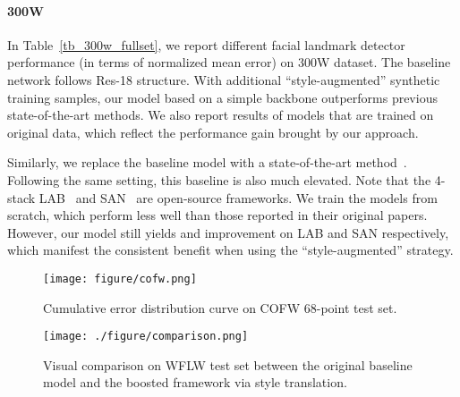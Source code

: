 \documentclass[10pt,twocolumn,letterpaper]{article}
\begin{document}
\vspace{-0.12in}
\paragraph{300W} 
In Table~\ref{tb_300w_fullset}, we report different facial landmark detector performance (in terms of normalized mean error) on 300W dataset. The baseline network follows Res-18 structure. With additional ``style-augmented'' synthetic training samples, our model based on a simple backbone outperforms previous state-of-the-art methods. We also report results of models that are trained on original data, which reflect the performance gain brought by our approach.

Similarly, we replace the baseline model with a state-of-the-art method~\cite{SAN}. Following the same setting, this baseline is also much elevated. Note that the 4-stack LAB~\cite{LAB} and SAN~\cite{SAN} are open-source frameworks. We train the models from scratch, which perform less well than those reported in their original papers. However, our model still yields  and  improvement on LAB and SAN respectively, which manifest the consistent benefit when using the ``style-augmented'' strategy.

\begin{figure}[t]
\begin{center}
  \texttt{[image: figure/cofw.png]}
\end{center}
\vspace{-0.5cm}
   \caption{{Cumulative error distribution curve on COFW 68-point test set.}}
\label{fig:cofw}
\vspace{-0.3cm}
\end{figure}

\begin{figure*}[t]
	\begin{center}
		\texttt{[image: ./figure/comparison.png]}
	\end{center}
	\vspace{-0.5cm}
	\caption{\small{Visual comparison on WFLW test set between the original baseline model and the boosted framework via style translation.}}
	\vspace{-0.2cm}
	\label{fig:comparison}
\end{figure*}
\end{document}
